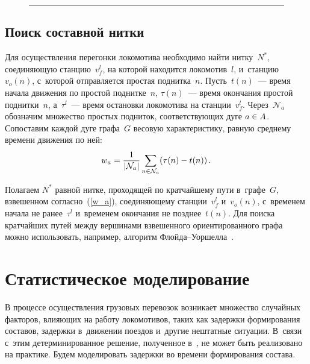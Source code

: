 \begin{multicols}{2}
\begin{figure*}
\begin{enumerate}[1.]
    \end{enumerate}
    \hrule
\end{figure*}



\vspace*{-6pt}

\subsection{Поиск составной нитки} \label{N*}

\vspace*{-2pt}

Для осуществления перегонки локомотива необходимо найти нитку~$N^*$, 
соединяющую станцию~$v^l_f$, на которой находится локомотив~$l$,\linebreak
 и~станцию~$v_o(n)$, 
с~которой отправляется прос\-тая поднитка~$n$. Пусть~$t(n)$~--- 
время начала движения по простой поднитке~$n$, $\tau(n)$~--- 
время окончания прос\-той поднитки~$n$, а~$\tau^l$~--- 
время остановки локомотива на станции~$v^l_f$. Через~$\mathcal N_a$ 
обозначим множество прос\-тых подниток, соответствующих дуге $a\hm\in A$. 
Сопоставим каждой дуге графа~$G$ весовую характеристику, равную среднему 
времени движения по ней:
\begin{equation}
    \label{w_a}
    w_a = \displaystyle\frac{\displaystyle 1\mathstrut}{\displaystyle |\mathcal N_a|\mathstrut}\sum\limits_{n\in \mathcal N_a} (\tau(n) - t(n))\,.
\end{equation}

Полагаем $N^*$ равной нитке, проходящей по кратчайшему пути в~графе~$G$, 
взвешенном согласно~(\ref{w_a}), соединяющему станции~$v^l_f$ и~$v_o(n)$, 
с~временем начала не ранее~$\tau^l$ и~временем окончания не позднее~$t(n)$. 
Для поиска кратчайших путей между вершинами взвешенного ориентированного графа 
можно использовать, например, алгоритм Флой\-да--Уор\-шел\-ла~\cite{Floyd}.

\vspace*{-6pt}

\section{Статистическое моделирование}

\vspace*{-2pt}

В процессе осуществления грузовых перевозок возникает множество случайных 
факторов, влияющих на работу локомотивов, таких как
задержки формирования составов, задержки в~движении поездов и~другие 
нештатные ситуации. 
В~связи с~этим детерминированное решение, полученное в~\cite{AzanovBuyanov}, 
не может быть реализовано на практике. Будем моделировать задержки во времени 
формирования состава.


\end{multicols}
